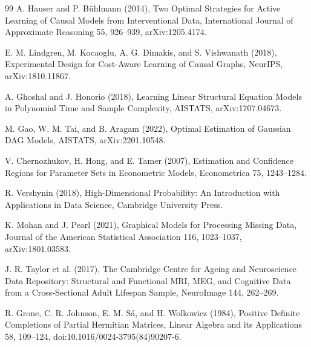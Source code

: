 \documentclass{article}
\begin{document}
\begin{thebibliography}{99}
   A. Hauser and P. Bühlmann (2014), Two Optimal Strategies for Active Learning of Causal Models from Interventional Data, International Journal of Approximate Reasoning 55, 926--939, arXiv:1205.4174.

   E. M. Lindgren, M. Kocaoglu, A. G. Dimakis, and S. Vishwanath (2018), Experimental Design for Cost-Aware Learning of Causal Graphs, NeurIPS, arXiv:1810.11867.

   A. Ghoshal and J. Honorio (2018), Learning Linear Structural Equation Models in Polynomial Time and Sample Complexity, AISTATS, arXiv:1707.04673.

   M. Gao, W. M. Tai, and B. Aragam (2022), Optimal Estimation of Gaussian DAG Models, AISTATS, arXiv:2201.10548.

   V. Chernozhukov, H. Hong, and E. Tamer (2007), Estimation and Confidence Regions for Parameter Sets in Econometric Models, Econometrica 75, 1243--1284.

   R. Vershynin (2018), High-Dimensional Probability: An Introduction with Applications in Data Science, Cambridge University Press.

   K. Mohan and J. Pearl (2021), Graphical Models for Processing Missing Data, Journal of the American Statistical Association 116, 1023--1037, arXiv:1801.03583.

   J. R. Taylor et al. (2017), The Cambridge Centre for Ageing and Neuroscience Data Repository: Structural and Functional MRI, MEG, and Cognitive Data from a Cross-Sectional Adult Lifespan Sample, NeuroImage 144, 262--269.

   R. Grone, C. R. Johnson, E. M. S\'a, and H. Wolkowicz (1984), Positive Definite Completions of Partial Hermitian Matrices, Linear Algebra and its Applications 58, 109--124, doi:10.1016/0024-3795(84)90207-6.

\end{thebibliography}
\end{document}
